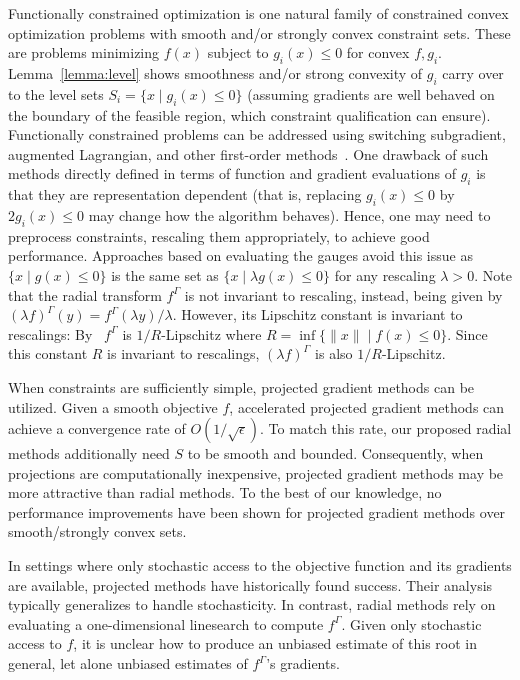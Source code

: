 \documentclass[sn-mathphys,Numbered]{sn-jnl}%
\begin{document}
Functionally constrained optimization is one natural family of constrained convex optimization problems with smooth and/or strongly convex constraint sets. These are problems minimizing $f(x)$ subject to $g_i(x)\leq 0$ for convex $f,g_i$. Lemma~\ref{lemma:level} shows smoothness and/or strong convexity of $g_i$ carry over to the level sets $S_i = \{x \mid g_i(x)\leq 0\}$ (assuming gradients are well behaved on the boundary of the feasible region, which constraint qualification can ensure).
Functionally constrained problems can be addressed using switching subgradient, augmented Lagrangian, and other first-order methods~\cite{Metel2021}. One drawback of such methods directly defined in terms of function and gradient evaluations of $g_i$ is that they are representation dependent (that is, replacing $g_i(x)\leq 0$ by $2g_i(x)\leq 0$ may change how the algorithm behaves). Hence, one may need to preprocess constraints, rescaling them appropriately, to achieve good performance. Approaches based on evaluating the gauges avoid this issue as $\{x \mid g(x)\leq 0\}$ is the same set as $\{x \mid \lambda g(x)\leq 0\}$ for any rescaling $\lambda>0$. Note that the radial transform $f^{\Gamma}$ is not invariant to rescaling, instead, being given by $(\lambda f)^{\Gamma} (y)=f^{\Gamma}(\lambda y)/\lambda$. However, its Lipschitz constant is invariant to rescalings: By~\cite[Proposition 1]{grimmer2023radial2} $f^\Gamma$ is $1/R$-Lipschitz where $R= \inf\{\|x\| \mid f(x)\leq 0\}$. Since this constant $R$ is invariant to rescalings, $(\lambda f)^{\Gamma}$ is also $1/R$-Lipschitz. 



When constraints are sufficiently simple, projected gradient methods can be utilized. Given a smooth objective $f$, accelerated projected gradient methods can achieve a convergence rate of $O(1/\sqrt{\epsilon})$. To match this rate, our proposed radial methods additionally need $S$ to be smooth and bounded. Consequently, when projections are computationally inexpensive, projected gradient methods may be more attractive than radial methods. To the best of our knowledge, no performance improvements have been shown for projected gradient methods over smooth/strongly convex sets.

In settings where only stochastic access to the objective function and its gradients are available, projected methods have historically found success. Their analysis typically generalizes to handle stochasticity. In contrast, radial methods rely on evaluating a one-dimensional linesearch to compute $f^\Gamma$. Given only stochastic access to $f$, it is unclear how to produce an unbiased estimate of this root in general, let alone unbiased estimates of $f^\Gamma$'s gradients.
\end{document}
